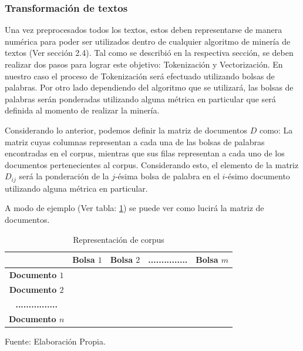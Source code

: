  
\subsubsection{Transformación de textos}
    Una vez preprocesados todos los textos, estos deben representarse de manera numérica para poder ser utilizados dentro de cualquier algoritmo de minería de textos (Ver sección 2.4). Tal como se describió en la respectiva sección, se deben realizar dos pasos para lograr este objetivo: Tokenización y Vectorización. En nuestro caso el proceso de Tokenización será efectuado utilizando bolsas de palabras. Por otro lado dependiendo del algoritmo que se utilizará, las bolsas de palabras serán ponderadas utilizando alguna métrica en particular que será definida al momento de realizar la minería. 
    
    Considerando lo anterior, podemos definir la matriz de documentos $D$ como: La matriz cuyas columnas representan a cada una de las bolsas de palabras encontradas en el corpus, mientras que sus filas representan a cada uno de los documentos pertenecientes al corpus. Considerando esto, el elemento de la matriz $D_{ij}$ será la ponderación de la $j$-ésima bolsa de palabra en el $i$-ésimo documento utilizando alguna métrica en particular.
    
    A modo de ejemplo (Ver tabla: \ref{table:matriz de datos}) se puede ver como lucirá la matriz de documentos.
    
    \begin{table}[H]
    \centering
    \begin{tabular}{c|c|c|l|l|}
    \cline{2-5}
    \textbf{}                                       & \textbf{Bolsa $1$} & \textbf{Bolsa $2$} & \textbf{...............} & \textbf{Bolsa $m$} \\ \hline
    \multicolumn{1}{|c|}{\textbf{Documento $1$}}    &                  &                  &                          &                  \\ \hline
    \multicolumn{1}{|c|}{\textbf{Documento $2$}}    &                  &                  &                          &                  \\ \hline
    \multicolumn{1}{|c|}{\textbf{................}} &                  &                  &                          &                  \\ \hline
    \multicolumn{1}{|c|}{\textbf{Documento $n$}}    &                  &                  &                          &                  \\ \hline
    \end{tabular}
     \caption{\label{table:matriz de datos} Representación de corpus} Fuente: Elaboración Propia.
    \end{table}
    
